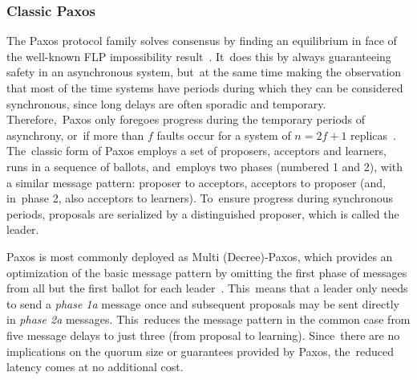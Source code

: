 \documentclass[algorithms,article,accept,moreauthors,pdftex,10pt,a4paper]{Definitions/mdpi}
\begin{document}
\subsubsection{{Classic} Paxos} 
The Paxos protocol family solves consensus by finding an equilibrium in face of the well-known {FLP} 
 impossibility result~\cite{FLP85}. It~does this by always guaranteeing safety in an asynchronous system, but~at the same time making the observation that most of the time systems have periods during which they can be considered synchronous, since long delays are often sporadic and temporary. Therefore,~Paxos only foregoes progress during the temporary periods of asynchrony, or~if more than $f$ faults occur for a system of $n=2f+1$ replicas~\cite{L01}. The~classic form of Paxos employs a set of proposers, acceptors and learners, runs in a sequence of ballots, and~employs two phases (numbered 1 and 2), with a similar message pattern: proposer to acceptors, acceptors to proposer (and, in~phase 2, also acceptors to learners). To~ensure progress during synchronous periods, proposals are serialized by a distinguished proposer, which is called the leader.\par
Paxos is most commonly deployed as Multi (Decree)-Paxos, which provides an optimization of the basic message pattern by omitting the first phase of messages from all but the first ballot for each leader~\cite{Renesse2011}. This~means that a leader only needs to send a \textit{phase 1a} message once and subsequent proposals may be sent directly in \textit{phase 2a} messages. This~reduces the message pattern in the common case from five message delays to just three (from proposal to learning). Since~there are no implications on the quorum size or guarantees provided by Paxos, the~reduced latency comes at no additional cost. \par
 
\end{document}
